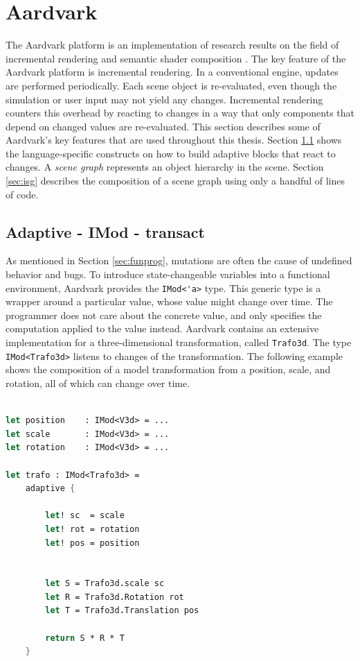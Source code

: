 \section{Aardvark}
\label{sec:aardvark}

The Aardvark platform \cite{aardvark} is an implementation of research results on the field of incremental rendering \cite{worister2013lazy, haaser2015incremental} and semantic shader composition \cite{haaser2014cosmo, haaser2014semantic}. 
The key feature of the Aardvark platform is incremental rendering. In a conventional engine, updates are performed periodically. Each scene object is re-evaluated, even though the simulation or user input may not yield any changes. Incremental rendering counters this overhead by reacting to changes in a way that only components that depend on changed values are re-evaluated. This section describes some of Aardvark's key features that are used throughout this thesis. Section \ref{sec:adaptive} shows the language-specific constructs on how to build adaptive blocks that react to changes. A \textit{scene graph} represents an object hierarchy in the scene. Section \ref{sec:isg} describes the composition of a scene graph using only a handful of lines of code. 

 
\subsection{Adaptive - IMod - transact}
\label{sec:adaptive}

As mentioned in Section \ref{sec:funprog}, mutations are often the cause of undefined behavior and bugs. To introduce state-changeable variables into a functional environment, Aardvark provides the \verb|IMod<'a>| type. This generic type is a wrapper around a particular value, whose value might change over time. The programmer does not care about the concrete value, and only specifies the computation applied to the value instead. Aardvark contains an extensive implementation for a three-dimensional transformation, called \verb|Trafo3d|. The type \verb|IMod<Trafo3d>| listens to changes of the transformation. The following example shows the composition of a model transformation from a position, scale, and rotation, all of which can change over time. 

\begin{lstlisting}[language = FSharp]

let position    : IMod<V3d> = ... 
let scale       : IMod<V3d> = ... 
let rotation    : IMod<V3d> = ...

let trafo : IMod<Trafo3d> = 
    adaptive {
    
        let! sc  = scale
        let! rot = rotation
        let! pos = position
        
        
        let S = Trafo3d.scale sc
        let R = Trafo3d.Rotation rot
        let T = Trafo3d.Translation pos
        
        return S * R * T
    }
\end{lstlisting}

